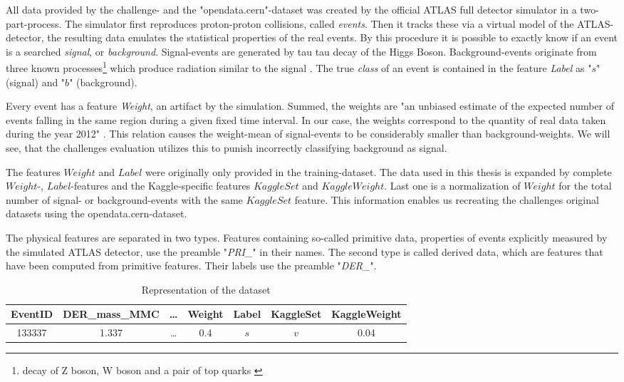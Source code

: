 All data provided by the challenge- and the "opendata.cern"-dataset \cite{higgsData} was created by the official ATLAS full detector simulator in a two-part-process. The simulator first reproduces proton-proton collisions, called \textit{events}. Then it tracks these via a virtual model of the ATLAS-detector, the resulting data emulates the statistical properties of the real events. By this procedure it is possible to exactly know if an event is a searched \textit{signal}, or \textit{background}. Signal-events are generated by tau tau decay of the Higgs Boson. Background-events originate from three known processes\footnote{decay of Z boson, W boson and a pair of top quarks \cite{higgsPaper}} which produce radiation similar to the signal \cite{higgsPaper}. The true \textit{class} of an event is contained in the feature \textit{Label} as "$s$" (signal) and "$b$" (background).

Every event has a feature \textit{Weight}, an artifact by the simulation. Summed, the weights are "an unbiased estimate of the expected number of events falling in the same region during a given fixed time interval. In our case, the weights correspond to the quantity of real data taken during the year 2012" \cite{higgsPaper}. This relation causes the weight-mean of signal-events to be considerably smaller than background-weights. We will see, that the challenges evaluation utilizes this to punish incorrectly classifying background as signal.

The features $Weight$ and $Label$ were originally only provided in the training-dataset. The data used in this thesis is expanded by complete $Weight$-, $Label$-features and the Kaggle-specific features $KaggleSet$ and $KaggleWeight$. Last one is a normalization of $Weight$ for the total number of signal- or background-events with the same $KaggleSet$ feature.
This information enables us recreating the challenges original datasets using the opendata.cern-dataset.

The physical features are separated in two types. Features containing so-called primitive data, properties of events explicitly measured by the simulated ATLAS detector, use the preamble "\textit{PRI\_}" in their names. The second type is called derived data, which are features that have been computed from primitive features. Their labels use the preamble "\textit{DER\_}".\\


\begin{table}[h]
	\begin{center}
		\begin{tabular}{ | c | c | c | c | c | c | c | }
		    \hline
		    EventID & DER\_mass\_MMC & \ldots & Weight & Label & KaggleSet & 
		    KaggleWeight \\
		    \hline
	    	133337  & 1.337   & \ldots & 0.4    & $s$ & $v$ & 0.04     \\
		    \hline
		\end{tabular} 
		\label{tab:data}
		\caption{Representation of the dataset}
	\end{center}
\end{table}


